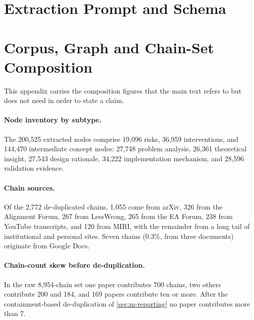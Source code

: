 \documentclass[10pt,twocolumn,letterpaper]{article}
\begin{document}



\clearpage
\appendix

\section{Extraction Prompt and Schema}
\label{app:prompt}

\section{Corpus, Graph and Chain-Set Composition}
\label{app:composition}

This appendix carries the composition figures that the main text refers to but does not
need in order to state a claim.

\paragraph{Node inventory by subtype.} The 200{,}525 extracted nodes comprise 19{,}096
risks, 36{,}959 interventions, and 144{,}470 intermediate concept nodes: 27{,}748 problem
analysis, 26{,}361 theoretical insight, 27{,}543 design rationale, 34{,}222
implementation mechanism, and 28{,}596 validation evidence.

\paragraph{Chain sources.} Of the 2{,}772 de-duplicated chains, 1{,}055 come from arXiv,
326 from the Alignment Forum, 267 from LessWrong, 265 from the EA Forum, 238 from YouTube
transcripts, and 120 from MIRI, with the remainder from a long tail of institutional and
personal sites. Seven chains (0.3\%, from three documents) originate from Google Docs.

\paragraph{Chain-count skew before de-duplication.} In the raw 8{,}954-chain set one
paper contributes 700 chains, two others contribute 200 and 184, and 169 papers
contribute ten or more. After the containment-based de-duplication of
\cref{sec:m-reporting} no paper contributes more than 7.
\end{document}
